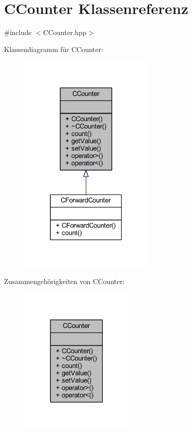 \hypertarget{class_c_counter}{}\section{C\+Counter Klassenreferenz}
\label{class_c_counter}


{\ttfamily \#include $<$C\+Counter.\+hpp$>$}



Klassendiagramm für C\+Counter\+:
\nopagebreak
\begin{figure}[H]
\begin{center}
\leavevmode
\includegraphics[width=187pt]{class_c_counter__inherit__graph}
\end{center}
\end{figure}


Zusammengehörigkeiten von C\+Counter\+:
\nopagebreak
\begin{figure}[H]
\begin{center}
\leavevmode
\includegraphics[width=158pt]{class_c_counter__coll__graph}
\end{center}
\end{figure}
